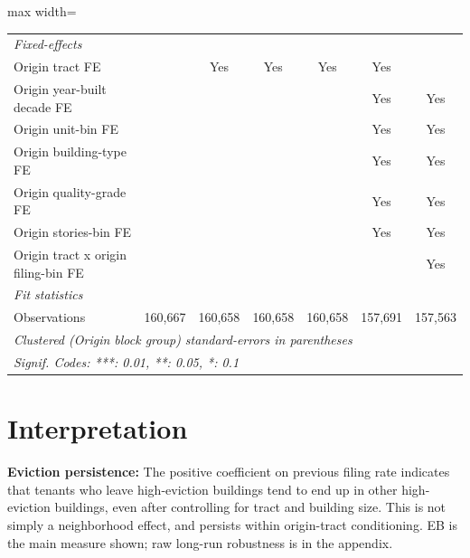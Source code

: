 \documentclass[
  11pt,
]{article}
\begin{document}
\begin{adjustbox}{max width=\textwidth}
\begin{tabular}{lcccccc}
   \midrule
   \emph{Fixed-effects}\\
   Origin tract FE                                 &          & Yes            & Yes            & Yes            & Yes                   & \\  
   Origin year-built decade FE                     &          &                &                &                & Yes                   & Yes\\  
   Origin unit-bin FE                              &          &                &                &                & Yes                   & Yes\\  
   Origin building-type FE                         &          &                &                &                & Yes                   & Yes\\  
   Origin quality-grade FE                         &          &                &                &                & Yes                   & Yes\\  
   Origin stories-bin FE                           &          &                &                &                & Yes                   & Yes\\  
   Origin tract x origin filing-bin FE             &          &                &                &                &                       & Yes\\  
   \midrule
   \emph{Fit statistics}\\
   Observations                                    & 160,667  & 160,658        & 160,658        & 160,658        & 157,691               & 157,563\\  
   \midrule \midrule
   \multicolumn{7}{l}{\emph{Clustered (Origin block group) standard-errors in parentheses}}\\
   \multicolumn{7}{l}{\emph{Signif. Codes: ***: 0.01, **: 0.05, *: 0.1}}\\
\end{tabular}
\par\endgroup

\end{adjustbox}

\section{Interpretation}\label{interpretation}

\textbf{Eviction persistence:} The positive coefficient on previous
filing rate indicates that tenants who leave high-eviction buildings
tend to end up in other high-eviction buildings, even after controlling
for tract and building size. This is not simply a neighborhood effect,
and persists within origin-tract conditioning. EB is the main measure
shown; raw long-run robustness is in the appendix.
\end{document}

